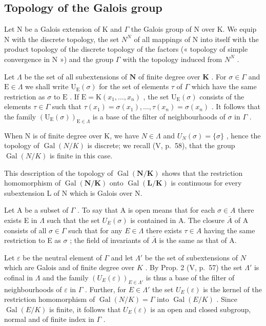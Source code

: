 \subsection{Topology of the Galois group}

Let N be a Galois extension of K and \(\Gamma\) the Galois group of N over K. We equip N with the discrete topology, the set \(N^{N}\) of all mappings of N into itself with the product topology of the discrete topology of the factors (« topology of simple convergence in N ») and the group \(\Gamma\) with the topology induced from \(N^{N}\) .

Let \(\Lambda\) be the set of all subextensions of \(\mathbf{N}\) of finite degree over \(\mathbf{K}\) . For \(\sigma \in \Gamma\) and \(\mathrm{E} \in \Lambda\) we shall write \(\mathrm{U}_{\mathrm{E}}(\sigma)\) for the set of elements \(\tau\) of \(\Gamma\) which have the same restriction as \(\sigma\) to \(\mathrm{E}\) . If \(\mathrm{E} = \mathrm{K}(x_1, \ldots, x_n)\) , the set \(\mathrm{U}_{\mathrm{E}}(\sigma)\) consists of the elements \(\tau \in \Gamma\) such that \(\tau(x_1) = \sigma(x_1), \ldots, \tau(x_n) = \sigma(x_n)\) . It follows that the family \((\mathrm{U}_{\mathrm{E}}(\sigma))_{\mathrm{E} \in \Lambda}\) is a base of the filter of neighbourhoods of \(\sigma\) in \(\Gamma\) .

When N is of finite degree over K, we have \(N \in \Lambda\) and \(U_{N}(\sigma) = \{\sigma\}\) , hence the topology of \(\operatorname{Gal}(N/K)\) is discrete; we recall (V, p.~58), that the group \(\operatorname{Gal}(N/K)\) is finite in this case.

This description of the topology of \(\operatorname{Gal}(\mathbf{N}/\mathbf{K})\) shows that the restriction homomorphism of \(\operatorname{Gal}(\mathbf{N}/\mathbf{K})\) onto \(\operatorname{Gal}(\mathbf{L}/\mathbf{K})\) is continuous for every subextension L of N which is Galois over N.

Let A be a subset of \(\Gamma\) . To say that A is open means that for each \(\sigma\in A\) there exists E in \(\Lambda\) such that the set \(U_{E}(\sigma)\) is contained in A. The closure \(\bar{A}\) of A consists of all \(\sigma\in\Gamma\) such that for any \(E\in\Lambda\) there exists \(\tau\in A\) having the same restriction to E as \(\sigma\) ; the field of invariants of \(\bar{A}\) is the same as that of A.

Let \(\varepsilon\) be the neutral element of \(\Gamma\) and let \(\Lambda'\) be the set of subextensions of \(N\) which are Galois and of finite degree over \(K\) . By Prop. 2 (V, p.~57) the set \(\Lambda'\) is cofinal in \(\Lambda\) and the family \((U_E(\varepsilon))_{E \in \Lambda'}\) is thus a base of the filter of neighbourhoods of \(\varepsilon\) in \(\Gamma\) . Further, for \(E \in \Lambda'\) the set \(U_E(\varepsilon)\) is the kernel of the restriction homomorphism of \(\operatorname{Gal}(N/K) = \Gamma\) into \(\operatorname{Gal}(E/K)\) . Since \(\operatorname{Gal}(E/K)\) is finite, it follows that \(U_E(\varepsilon)\) is an open and closed subgroup, normal and of finite index in \(\Gamma\) .

